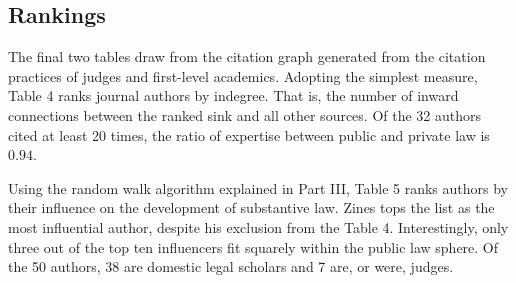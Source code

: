\subsection{Rankings}

The final two tables draw from the citation graph generated from the citation practices of judges and first-level academics. Adopting the simplest measure, Table 4 ranks journal authors by indegree. That is, the number of inward connections between the ranked sink and all other sources. Of the 32 authors cited at least 20 times, the ratio of expertise between public and private law is $0.94$.

Using the random walk algorithm explained in Part III, Table 5 ranks authors by their influence on the development of substantive law. Zines tops the list as the most influential author, despite his exclusion from the Table 4. Interestingly, only three out of the top ten influencers fit squarely within the public law sphere. Of the 50 authors, 38 are domestic legal scholars and 7 are, or were, judges.

